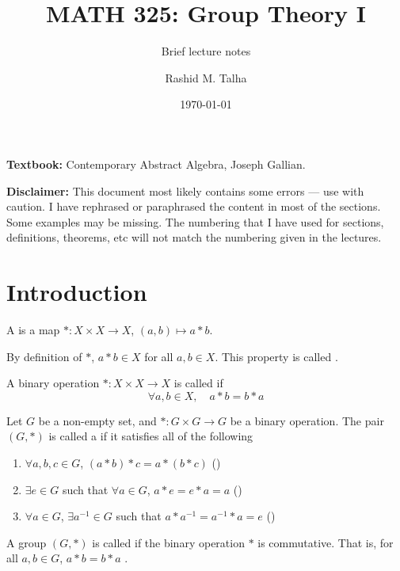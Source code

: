 \documentclass[11pt]{penrose}
\title{MATH 325: Group Theory I}
\subtitle{Brief lecture notes}
\author{Rashid M. Talha}
\affiliation{School of Natural Sciences, NUST}
\date{\today}
\begin{document}
\maketitle

\textbf{Textbook:} Contemporary Abstract Algebra, Joseph Gallian.

\textbf{Disclaimer:} This document most likely contains some errors --- use with caution. I have rephrased or paraphrased the content in most of the sections. Some examples may be missing. The numbering that I have used for sections, definitions, theorems, etc will not match the numbering given in the lectures.

\section{Introduction}
\begin{ndfn}
    A  is a map $* : X \times X \to X$, $(a,b) \mapsto a * b$.
\end{ndfn}

By definition of $*$, $a * b \in X$ for all $a, b \in X$. This property is called .

\begin{ndfn}
    A binary operation $* : X \times X \to X$ is called  if
    \begin{equation*}
        \forall a, b \in X, \quad a * b = b * a
    \end{equation*}
\end{ndfn}

\begin{ndfn}
    Let $G$ be a non-empty set, and $* : G \times G \to G$ be a binary operation. The pair $(G, *)$ is called a  if it satisfies all of the following
    \begin{enumerate}[label=(\roman*)]
        \item $\forall a, b, c \in G$, $(a * b) * c = a * (b * c)$ \hfill()
        \item $\exists e \in G$ such that $\forall a \in G$, $a * e = e * a = a$ \hfill()
        \item $\forall a \in G$, $\exists a^{-1} \in G$ such that $a * a^{-1} = a^{-1} * a = e$ \hfill()
    \end{enumerate}
\end{ndfn}

\begin{ndfn}
    A group $(G, *)$ is called  if the binary operation $*$ is commutative. That is, for all $a, b \in G$, $a * b = b * a$ .
\end{ndfn}
\end{document}
